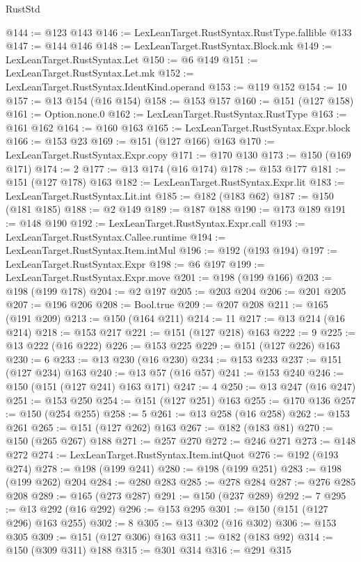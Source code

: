 \begin{lexlean}{RustStd}
\begin{coremodule}
@144 := @123 @143
@146 := LexLeanTarget.RustSyntax.RustType.fallible @133
@147 := @144 @146
@148 := LexLeanTarget.RustSyntax.Block.mk
@149 := LexLeanTarget.RustSyntax.Let
@150 := @6 @149
@151 := LexLeanTarget.RustSyntax.Let.mk
@152 := LexLeanTarget.RustSyntax.IdentKind.operand
@153 := @119 @152
@154 := 10
@157 := @13 @154 (@16 @154)
@158 := @153 @157
@160 := @151 (@127 @158)
@161 := Option.none.{0}
@162 := LexLeanTarget.RustSyntax.RustType
@163 := @161 @162
@164 := @160 @163
@165 := LexLeanTarget.RustSyntax.Expr.block
@166 := @153 @23
@169 := @151 (@127 @166) @163
@170 := LexLeanTarget.RustSyntax.Expr.copy
@171 := @170 @130
@173 := @150 (@169 @171)
@174 := 2
@177 := @13 @174 (@16 @174)
@178 := @153 @177
@181 := @151 (@127 @178) @163
@182 := LexLeanTarget.RustSyntax.Expr.lit
@183 := LexLeanTarget.RustSyntax.Lit.int
@185 := @182 (@183 @62)
@187 := @150 (@181 @185)
@188 := @2 @149
@189 := @187 @188
@190 := @173 @189
@191 := @148 @190
@192 := LexLeanTarget.RustSyntax.Expr.call
@193 := LexLeanTarget.RustSyntax.Callee.runtime
@194 := LexLeanTarget.RustSyntax.Item.intMul
@196 := @192 (@193 @194)
@197 := LexLeanTarget.RustSyntax.Expr
@198 := @6 @197
@199 := LexLeanTarget.RustSyntax.Expr.move
@201 := @198 (@199 @166)
@203 := @198 (@199 @178)
@204 := @2 @197
@205 := @203 @204
@206 := @201 @205
@207 := @196 @206
@208 := Bool.true
@209 := @207 @208
@211 := @165 (@191 @209)
@213 := @150 (@164 @211)
@214 := 11
@217 := @13 @214 (@16 @214)
@218 := @153 @217
@221 := @151 (@127 @218) @163
@222 := 9
@225 := @13 @222 (@16 @222)
@226 := @153 @225
@229 := @151 (@127 @226) @163
@230 := 6
@233 := @13 @230 (@16 @230)
@234 := @153 @233
@237 := @151 (@127 @234) @163
@240 := @13 @57 (@16 @57)
@241 := @153 @240
@246 := @150 (@151 (@127 @241) @163 @171)
@247 := 4
@250 := @13 @247 (@16 @247)
@251 := @153 @250
@254 := @151 (@127 @251) @163
@255 := @170 @136
@257 := @150 (@254 @255)
@258 := 5
@261 := @13 @258 (@16 @258)
@262 := @153 @261
@265 := @151 (@127 @262) @163
@267 := @182 (@183 @81)
@270 := @150 (@265 @267) @188
@271 := @257 @270
@272 := @246 @271
@273 := @148 @272
@274 := LexLeanTarget.RustSyntax.Item.intQuot
@276 := @192 (@193 @274)
@278 := @198 (@199 @241)
@280 := @198 (@199 @251)
@283 := @198 (@199 @262) @204
@284 := @280 @283
@285 := @278 @284
@287 := @276 @285 @208
@289 := @165 (@273 @287)
@291 := @150 (@237 @289)
@292 := 7
@295 := @13 @292 (@16 @292)
@296 := @153 @295
@301 := @150 (@151 (@127 @296) @163 @255)
@302 := 8
@305 := @13 @302 (@16 @302)
@306 := @153 @305
@309 := @151 (@127 @306) @163
@311 := @182 (@183 @92)
@314 := @150 (@309 @311) @188
@315 := @301 @314
@316 := @291 @315

\end{coremodule}
\end{lexlean}

